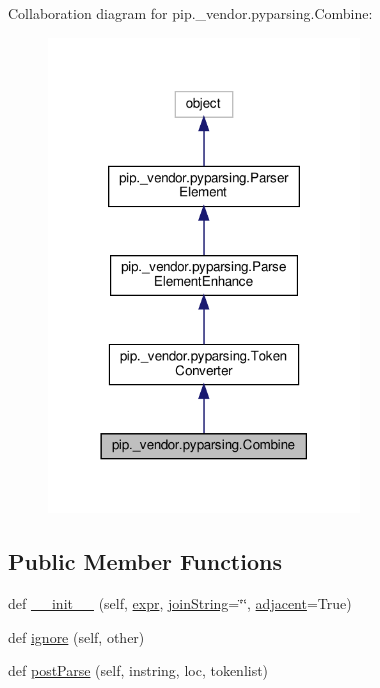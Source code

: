 Collaboration diagram for pip.\+\_\+vendor.\+pyparsing.\+Combine\+:
\nopagebreak
\begin{figure}[H]
\begin{center}
\leavevmode
\includegraphics[width=234pt]{classpip_1_1__vendor_1_1pyparsing_1_1Combine__coll__graph}
\end{center}
\end{figure}
\subsection*{Public Member Functions}
\begin{DoxyCompactItemize}
\item 
def \hyperlink{classpip_1_1__vendor_1_1pyparsing_1_1Combine_a405256dc18913b78cb734d63a1760f82}{\+\_\+\+\_\+init\+\_\+\+\_\+} (self, \hyperlink{classpip_1_1__vendor_1_1pyparsing_1_1ParseElementEnhance_af574b49a0a7d914693fdaa833df7098f}{expr}, \hyperlink{classpip_1_1__vendor_1_1pyparsing_1_1Combine_ab5a6bba58ca69cd1fca48a09cca161f1}{join\+String}=\char`\"{}\char`\"{}, \hyperlink{classpip_1_1__vendor_1_1pyparsing_1_1Combine_ab2a725e5ca77b07bf7ce08028fa863e8}{adjacent}=True)
\item 
def \hyperlink{classpip_1_1__vendor_1_1pyparsing_1_1Combine_a52c285338d1dcd3aa52ea876620d1053}{ignore} (self, other)
\item 
def \hyperlink{classpip_1_1__vendor_1_1pyparsing_1_1Combine_a4f8026a744fafdc7fda560220b27aabe}{post\+Parse} (self, instring, loc, tokenlist)
\end{DoxyCompactItemize}
